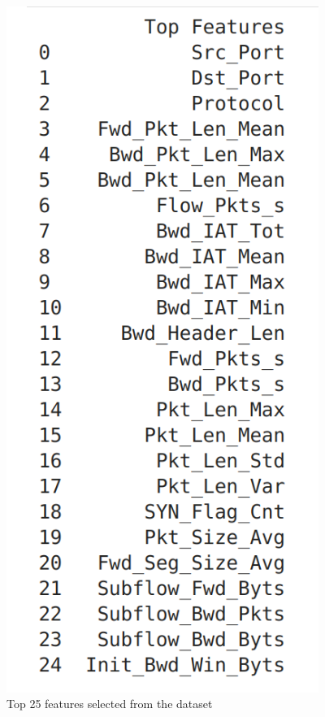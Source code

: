 \begin{figure}[tbh]
	\begin{center}
		\includegraphics[width=4in]{images/topF.png}
		\caption{Top 25 features selected from the dataset }
		\label{Top 25 features selected from the dataset}
	\end{center}
\end{figure}
